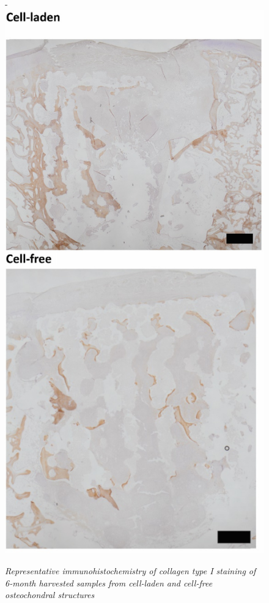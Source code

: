\documentclass[twocolumn, empirical, authordate, issue]{jote-new-article}
\begin{document}
\begin{figure}
\begin{adjustwidth}{-\fullwidthlen}{}
 \includegraphics[width=.8\columnwidth+\fullwidthlen]{media/image16_1.jpg}
\caption{\emph{Representative immunohistochemistry of collagen type I staining of 6-month harvested samples from cell-laden and cell-free osteochondral structures}}
\label{fig:sup5}
\end{adjustwidth}
\end{figure}
\end{document}
